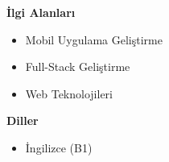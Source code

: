 \documentclass[a4paper,11pt]{article}
\begin{document}
\vspace{0.1em}
\noindent
\begin{minipage}[t]{0.48\textwidth}
    \textbf{İlgi Alanları}
    \vspace{0em}
    \begin{itemize}
        \item Mobil Uygulama Geliştirme
        \item Full-Stack Geliştirme
        \item Web Teknolojileri
    \end{itemize}
\end{minipage}%
\hfill
\begin{minipage}[t]{0.48\textwidth}
    \textbf{Diller}
    \vspace{0em}
    \begin{itemize}
        \item İngilizce (B1)
    \end{itemize}
\end{minipage}
\end{document}
